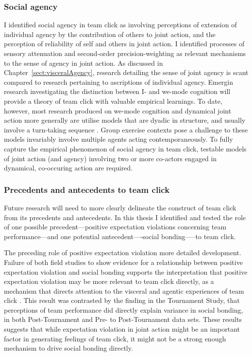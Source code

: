 \subsubsection{Social agency}
I identified social agency in team click as involving perceptions of extension of individual agency by the contribution of others to joint action, and the perception of reliability of self and others in joint action.  I identified  processes of sensory attenuation and second-order precision-weighting as relevant mechanisms to the sense of agency in joint action.  As discussed in Chapter~\ref{sect:visceralAgency}, research detailing the sense of joint agency is scant compared to research pertaining to ascriptions of individual agency.  Emergin research investigating the distinction between I- and we-mode cognition \citep{Gallotti2013,VanderWel2015,Noy2017} will provide a theory of team click with valuable empirical learnings.  To date, however, most research produced on we-mode cognition and dynamical joint action more generally are utilise models that are dyadic in structure, and usually involve a turn-taking sequence \citep{Friston2015,Pesquita2017}.  Group exercise contexts pose a challenge to these models invariably involve multiple agents acting contemporaneously. To fully capture the empirical phenomenon of social agency in team click, testable models of joint action (and agency) involving two or more co-actors engaged in dynamical, co-occuring action are required.

\subsubsection{Precedents and antecedents to team click}
Future research will need to more clearly delineate the construct of team click from its precedents and antecedents.  In this thesis I identified and tested the role of one possible precedent—positive expectation violations concerning team performance—and one potential antecedent----social bonding—--to team click.

The preceding role of positive expectation violation more detailed development.  Failure of both field studies to show evidence for a relationship between positive expectation violation and social bonding supports the interpretation that positive expectation violation may be more relevant to team click directly, as a mechanism that directs attention to the visceral and agentic experiences of team click \citep{Chetverikov2016}.  This result was contrasted by the finding in the Tournament Study, that perceptions of team performance did directly explain variance in social bonding, in both Post-Tournament and Pre- to Post-Tournament data sets.  These results suggests that while expectation violation in joint action might be an important factor in generating feelings of team click, it might not be a strong enough mechanism to drive social bonding directly.


